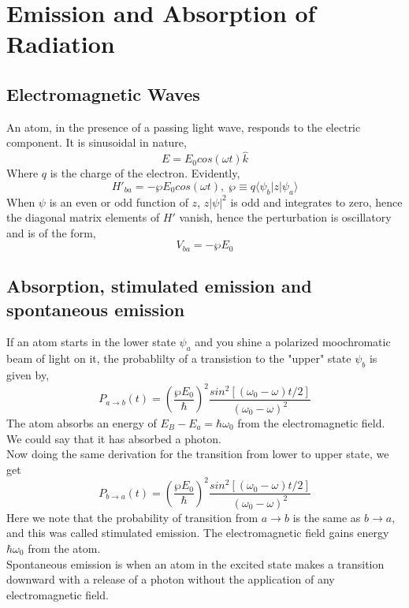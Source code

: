 \section{Emission and Absorption of Radiation}
\subsection{Electromagnetic Waves}
An atom, in the presence of a passing light wave, responds to the electric component. It is sinusoidal in nature,
\begin{equation}
	E= E_0cos(\omega t)\hat{k}
\end{equation}
Where $q$ is the charge of the electron. Evidently,
\begin{equation}
	H'_{ba}=-\wp E_0cos(\omega t), \; \wp\equiv q\langle\psi_b|z|\psi_a\rangle
\end{equation}
When $\psi$ is an even or odd function of $z$, $z|\psi|^2$ is odd and integrates to zero, hence the diagonal matrix elements of $H'$ vanish, hence the perturbation is oscillatory and is of the form,
\begin{equation}
	V_{ba}=-\wp E_0
\end{equation}

\subsection{Absorption, stimulated emission and spontaneous emission}
If an atom starts in the lower state $\psi_a$ and you shine a polarized moochromatic beam of light on it, the probablilty of a transistion to the "upper" state $\psi_b$ is given by,
\begin{equation}
	P_{a\rightarrow b}(t)=\left(\frac{\wp E_0}{\hbar}\right)^2\frac{sin^2[(\omega_0-\omega) t/2]}{(\omega_0-\omega)^2}
\end{equation}
The atom absorbs an energy of $E_B-E_a=\hbar\omega_0$ from the electromagnetic field. We could say that it has absorbed a photon.\\
Now doing the same derivation for the transition from lower to upper state, we get
\begin{equation}
	P_{b\rightarrow a}(t)=\left(\frac{\wp E_0}{\hbar}\right)^2\frac{sin^2[(\omega_0-\omega) t/2]}{(\omega_0-\omega)^2}
\end{equation}
Here we note that the probability of transition from $a\rightarrow b$ is the same as $b\rightarrow a$, and this was called stimulated emission. The electromagnetic field gains energy $\hbar\omega_0$ from the atom.\\
Spontaneous emission is when an atom in the excited state makes a transition downward with a release of a photon without the application of any electromagnetic field.

